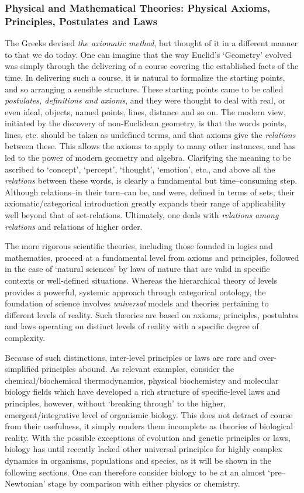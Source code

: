\documentclass[12pt]{article}
\theoremstyle{plain}
\theoremstyle{definition}
\theoremstyle{plain}
\numberwithin{equation}{section}
\begin{document}
\subsubsection{Physical and Mathematical Theories: Physical Axioms, Principles, Postulates and Laws}

 The Greeks devised \emph{the axiomatic method}, but thought of it
in a different manner to that we do today. One can imagine that
the way Euclid's `Geometry' evolved was simply through the
delivering of a course covering the established facts of the time.
In delivering such a course, it is natural to formalize the
starting points, and so arranging a sensible structure. These
starting points came to be called \emph{postulates, definitions
and axioms}, and they were thought to deal with real, or even
ideal, objects, named points, lines, distance and so on. The
modern view, initiated by the discovery of non-Euclidean geometry,
is that the words points, lines, etc. should be taken as undefined
terms, and that axioms give the \emph{relations} between these.
This allows the axioms to apply to many other instances, and has
led to the power of modern geometry and algebra. Clarifying the meaning to be ascribed to `concept', `percept', `thought', `emotion', etc., and above all the \emph{relations} between these words, is clearly a fundamental but
time--consuming step. Although relations--in their turn--can be, and
were, defined in terms of sets, their axiomatic/categorical
introduction greatly expands their range of applicability well beyond that of set-relations.
Ultimately, one deals with \emph{relations among relations} and relations of higher order.

 The more rigorous scientific theories, including those founded in
logics and mathematics, proceed at a fundamental level from axioms
and principles, followed in the case of `natural sciences' by laws
of nature that are valid in specific contexts or well-defined
situations. Whereas the hierarchical theory of levels provides a powerful,
systemic approach through categorical ontology, the foundation
of science involves \emph{universal} models and theories
pertaining to different levels of reality. Such theories are based
on axioms, principles, postulates and laws operating on distinct
levels of reality with a specific degree of complexity. 

 Because of such distinctions, inter-level principles or laws are rare and
over-simplified principles abound.  As relevant examples, consider
the chemical/biochemical thermodynamics, physical biochemistry
and molecular biology fields which have developed a rich structure
of specific-level laws and principles, however, without `breaking
through' to the higher, emergent/integrative level of organismic
biology. This does not detract of course from their usefulness, it
simply renders them incomplete as theories of biological reality.
With the possible exceptions of evolution and genetic principles 
or laws, biology has until recently lacked other universal principles 
for highly complex dynamics in organisms, populations and species, 
as it will be shown in the following sections. One
can therefore consider biology to be at an almost `pre--Newtonian'
stage by comparison with either physics or chemistry.
\end{document}
